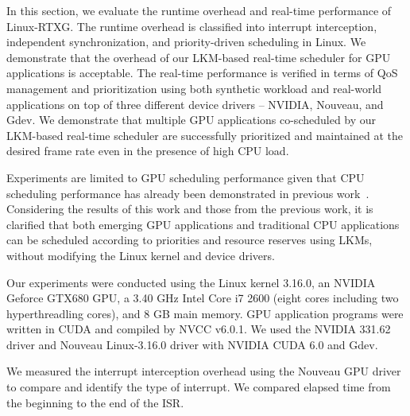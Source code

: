 \label{sec:evaluation}
In this section, we evaluate the runtime overhead and real-time
performance of Linux-RTXG.
The runtime overhead is classified into interrupt interception,
independent synchronization, and priority-driven scheduling in Linux.
We demonstrate that the overhead of our LKM-based real-time scheduler
for GPU applications is acceptable.
The real-time performance is verified in terms of QoS management and
prioritization using both synthetic workload and real-world
applications on top of three different device drivers -- NVIDIA,
Nouveau, and Gdev.
We demonstrate that multiple GPU applications co-scheduled by our
LKM-based real-time scheduler are successfully prioritized and
maintained at the desired frame rate even in the presence of high CPU
load.

Experiments are limited to GPU scheduling performance given that CPU
scheduling performance has already been demonstrated in previous
work~\cite{kato2009loadable}.
Considering the results of this work and those from the previous work,
it is clarified that both emerging GPU applications and traditional CPU
applications can be scheduled according to priorities and resource
reserves using LKMs, without modifying the Linux kernel and device
drivers.

Our experiments were conducted using the Linux kernel 3.16.0, an NVIDIA
Geforce GTX680 GPU, a 3.40 GHz Intel Core i7 2600 (eight cores including
two hyperthreadling cores), and 8 GB main memory.  
GPU application programs were written in CUDA and compiled by NVCC v6.0.1.
We used the NVIDIA 331.62 driver and Nouveau Linux-3.16.0 driver with
NVIDIA CUDA 6.0 and Gdev. 

We measured the interrupt interception overhead using the Nouveau GPU driver to compare and identify the type of interrupt.
We compared elapsed time from the beginning to the end of the ISR.

